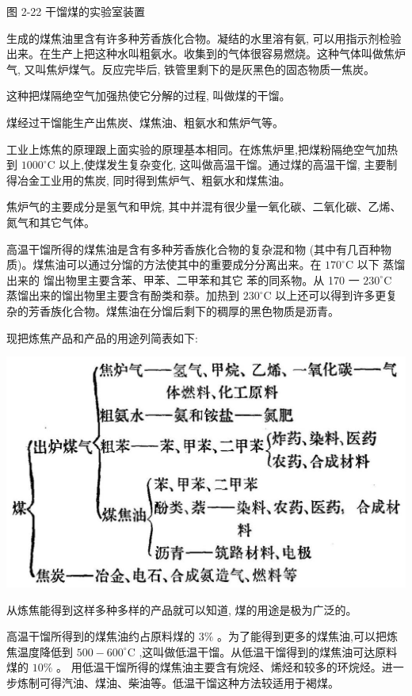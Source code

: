 \documentclass[10pt]{article}
\begin{document}
图 2-22 干馏煤的实验室装置

生成的煤焦油里含有许多种芳香族化合物。凝结的水里溶有氨, 可以用指示剂检验出来。在生产上把这种水叫粗氨水。收集到的气体很容易燃烧。这种气体叫做焦炉气, 又叫焦炉煤气。反应完毕后, 铁管里剩下的是灰黑色的固态物质一焦炭。

这种把煤隔绝空气加强热使它分解的过程, 叫做煤的干馏。

煤经过干馏能生产出焦炭、煤焦油、粗氨水和焦炉气等。

工业上炼焦的原理跟上面实验的原理基本相同。在炼焦炉里,把煤粉隔绝空气加热到 \({1000}^{ \circ }\mathrm{C}\) 以上,使煤发生复杂变化, 这叫做高温干馏。通过煤的高温干馏, 主要制得冶金工业用的焦炭, 同时得到焦炉气、粗氨水和煤焦油。

焦炉气的主要成分是氢气和甲烷, 其中并混有很少量一氧化碳、二氧化碳、乙烯、氮气和其它气体。

高温干馏所得的煤焦油是含有多种芳香族化合物的复杂混和物 (其中有几百种物质)。煤焦油可以通过分馏的方法使其中的重要成分分离出来。在 \({170}^{ \circ }\mathrm{C}\) 以下 蒸馏出来的 馏出物里主要含苯、甲苯、二甲苯和其它 苯的同系物。从 170 一 \({230}^{ \circ }\mathrm{C}\) 蒸馏出来的馏出物里主要含有酚类和萘。加热到 \({230}^{ \circ }\mathrm{C}\) 以上还可以得到许多更复杂的芳香族化合物。煤焦油在分馏后剩下的稠厚的黑色物质是沥青。

现把炼焦产品和产品的用途列简表如下:

\begin{center}
\includegraphics[max width=1.0\textwidth]{images/01912d16-be99-77bb-9535-4f3ed8d9946f_103_829811.jpg}
\end{center}

从炼焦能得到这样多种多样的产品就可以知道, 煤的用途是极为广泛的。

高温干馏所得到的煤焦油约占原料煤的 \(3\%\) 。为了能得到更多的煤焦油,可以把炼焦温度降低到 \({500} - {600}^{ \circ }\mathrm{C}\) ,这叫做低温干馏。从低温干馏得到的煤焦油可达原料煤的 \({10}\%\) 。 用低温干馏所得的煤焦油主要含有烷烃、烯烃和较多的环烷烃。进一步炼制可得汽油、煤油、柴油等。低温干馏这种方法较适用于褐煤。
\end{document}
